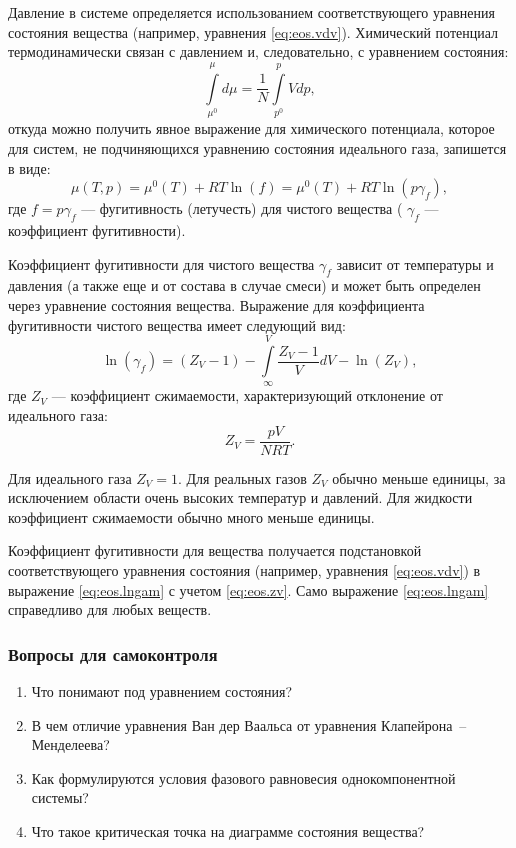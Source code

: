 Давление в системе определяется использованием соответствующего уравнения состояния вещества (например, уравнения \eqref{eq:eos.vdv}). Химический потенциал термодинамически связан с давлением и, следовательно, с уравнением состояния: 
\begin{equation}
	\int\limits_{\mu^0}^{\mu} d \mu = \dfrac{1}{N} \int\limits_{p^0}^{p} V dp,
\end{equation}
откуда можно получить явное выражение для химического потенциала, которое для систем, не подчиняющихся уравнению состояния идеального газа, запишется в виде:
\begin{equation}
	\mu(T,p)=\mu^0(T)+R T \ln (f)=\mu^0 (T) + R T \ln (p \gamma_f),
\end{equation}
где $f=p \gamma_f$ --- фугитивность (летучесть) для чистого вещества ( $\gamma_f$ --- коэффициент фугитивности).

Коэффициент фугитивности для чистого вещества $\gamma_f$ зависит от температуры и давления (а также еще и от состава в случае смеси) и может быть определен через уравнение состояния вещества. Выражение для коэффициента фугитивности чистого вещества имеет следующий вид:
\begin{equation}\label{eq:eos.lngam}
	\ln (\gamma_f) = (Z_V -1) - \int\limits_{\infty}^{V} {\dfrac{Z_V-1}{V} d V} -\ln(Z_V),
\end{equation}
где $Z_V$ --- коэффициент  сжимаемости, характеризующий отклонение от идеального газа:
\begin{equation} \label{eq:eos.zv}
	Z_V=\dfrac{p V}{N R T}.
\end{equation}

Для идеального газа $Z_V=1$. Для реальных газов $Z_V$ обычно меньше единицы, за исключением области очень высоких температур и давлений. Для жидкости коэффициент сжимаемости обычно много меньше единицы.

Коэффициент фугитивности для вещества получается подстановкой соответствующего уравнения состояния (например, уравнения \eqref{eq:eos.vdv}) в выражение \eqref{eq:eos.lngam} с учетом \eqref{eq:eos.zv}. Само выражение \eqref{eq:eos.lngam} справедливо для любых веществ. 

\subsubsection*{Вопросы для самоконтроля}
\begin{enumerate}
\item Что понимают под уравнением состояния?
\item В чем отличие уравнения Ван дер Ваальса от уравнения Клапейрона~-- Менделеева?
\item Как формулируются условия фазового равновесия однокомпонентной системы?
\item Что такое критическая точка на диаграмме состояния вещества?
\end{enumerate}


